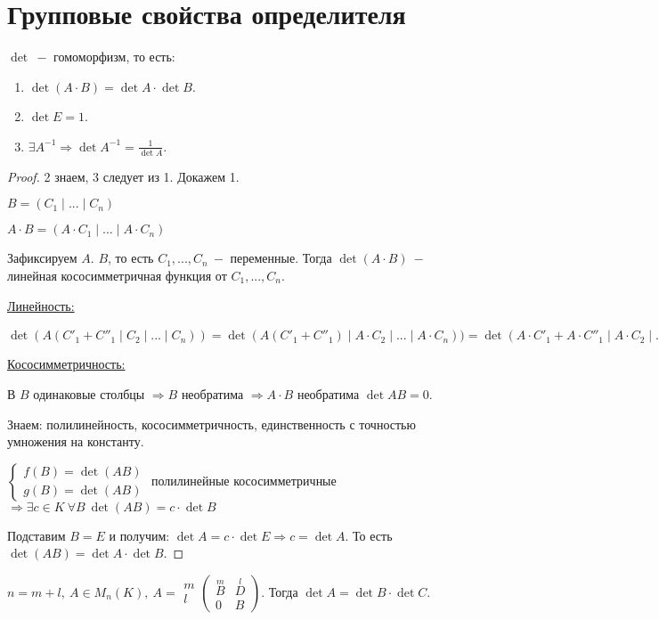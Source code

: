 \section{Групповые свойства определителя}

\begin{theorem}
    $\det\ -$ гомоморфизм, то есть:
    \begin{enumerate}
        \item $\det (A\cdot B)=\det A\cdot \det B$.
        \item $\det E=1$.
        \item $\exists A^{-1}\Rightarrow \det A^{-1}=\frac{1}{\det A}$.
    \end{enumerate}
\end{theorem}

\begin{proof}
    2 знаем, 3 следует из 1. Докажем 1.

    $B=(C_1\mid ...\mid C_n)$

    $A\cdot B=(A\cdot C_1\mid ...\mid A\cdot C_n)$

    Зафиксируем $A$. $B$, то есть $C_1,...,C_n\ -$ переменные. Тогда $\det (A\cdot B)\ -$ линейная кососимметричная функция от $C_1,...,C_n$.

    \underline{Линейность:}

    $\det (A(C'_1+C''_1\mid C_2\mid ...\mid C_n))=\det (A(C'_1+C''_1)\mid A\cdot C_2\mid ...\mid A\cdot C_n))=    \det (A\cdot C'_1+A\cdot C''_1\mid A\cdot C_2\mid ...\mid A\cdot C_n)\overset{\text{полилин-ть $\det$}}{=}\det(...)+\det(...)$

    \underline{Кососимметричность:}

    В $B$ одинаковые столбцы $\Rightarrow B$ необратима $\Rightarrow A\cdot B$ необратима $\det AB=0$.

    Знаем: полилинейность, кососимметричность, единственность с точностью умножения на константу.

    $\begin{cases} f(B)=\det(AB) \\ g(B)=\det(AB)
    \end{cases}$ полилинейные кососимметричные $\Rightarrow \exists c\in K\ \forall B\ \det(AB)=c\cdot \det B$

    Подставим $B=E$ и получим: $\det A=c\cdot \det E\Rightarrow c=\det A$. То есть $\det (AB)=\det A\cdot \det B$.
\end{proof}

\begin{theorem}
    $n=m+l,\ A\in M_n(K),\ A=\begin{array}{c} m \\ l
    \end{array}\left(\begin{array}{c|c} \overset{m}{B} & \overset{l}{D} \\
    \hline
    0 & B
    \end{array}\right)$. Тогда $\det A=\det B\cdot \det C$.
\end{theorem}

